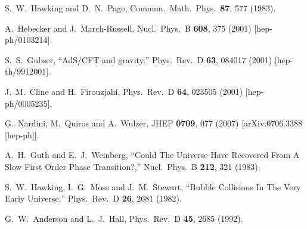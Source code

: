 \documentclass[12pt]{article}
\begin{document}
\begin{thebibliography}{99}
  S.~W.~Hawking and D.~N.~Page,
  Commun.\ Math.\ Phys.\  {\bf 87}, 577 (1983).
  
  
  
  A.~Hebecker and J.~March-Russell,
  Nucl.\ Phys.\ B {\bf 608}, 375 (2001)
  [hep-ph/0103214].
  

 
 
  
  





S.~S.~Gubser,
``AdS/CFT and gravity,''
Phys.\ Rev.\ D {\bf 63}, 084017 (2001)
[hep-th/9912001].
  
  
  J.~M.~Cline and H.~Firouzjahi,
  Phys.\ Rev.\ D {\bf 64}, 023505 (2001)
  [hep-ph/0005235].
  
  G.~Nardini, M.~Quiros and A.~Wulzer,
  JHEP {\bf 0709}, 077 (2007)
  [arXiv:0706.3388 [hep-ph]].
  
A.~H.~Guth and E.~J.~Weinberg,
``Could The Universe Have Recovered From A Slow First Order Phase Transition?,''
Nucl.\ Phys.\ B {\bf 212}, 321 (1983).
 

S.~W.~Hawking, I.~G.~Moss and J.~M.~Stewart,
``Bubble Collisions In The Very Early Universe,''
Phys.\ Rev.\ D {\bf 26}, 2681 (1982).

  G.~W.~Anderson and L.~J.~Hall,
  Phys.\ Rev.\ D {\bf 45}, 2685 (1992).
  


\end{thebibliography}
\end{document}

